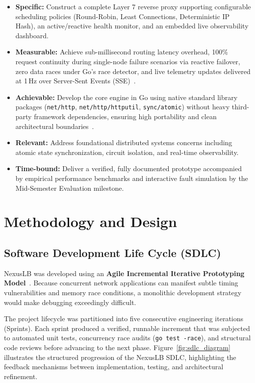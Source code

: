 \documentclass[12pt,openany]{report}
\begin{document}
\begin{itemize}
  \item \textbf{Specific:} Construct a complete Layer 7 reverse proxy supporting configurable scheduling policies (Round-Robin, Least Connections, Deterministic IP Hash), an active/reactive health monitor, and an embedded live observability dashboard.
  \item \textbf{Measurable:} Achieve sub-millisecond routing latency overhead, 100\% request continuity during single-node failure scenarios via reactive failover, zero data races under Go's race detector, and live telemetry updates delivered at 1\,Hz over Server-Sent Events (SSE)~\cite{whatwg_sse}.
  \item \textbf{Achievable:} Develop the core engine in Go using native standard library packages (\texttt{net/http}, \texttt{net/http/httputil}, \texttt{sync/atomic}) without heavy third-party framework dependencies, ensuring high portability and clean architectural boundaries~\cite{donovan2015}.
  \item \textbf{Relevant:} Address foundational distributed systems concerns including atomic state synchronization, circuit isolation, and real-time observability.
  \item \textbf{Time-bound:} Deliver a verified, fully documented prototype accompanied by empirical performance benchmarks and interactive fault simulation by the Mid-Semester Evaluation milestone.
\end{itemize}


\chapter{Methodology and Design}

\section{Software Development Life Cycle (SDLC)}

NexusLB was developed using an \textbf{Agile Incremental Iterative Prototyping Model}~\cite{sommerville2016}. Because concurrent network applications can manifest subtle timing vulnerabilities and memory race conditions, a monolithic development strategy would make debugging exceedingly difficult.

The project lifecycle was partitioned into five consecutive engineering iterations (Sprints). Each sprint produced a verified, runnable increment that was subjected to automated unit tests, concurrency race audits (\texttt{go test -race}), and structural code reviews before advancing to the next phase. Figure~\ref{fig:sdlc_diagram} illustrates the structured progression of the NexusLB SDLC, highlighting the feedback mechanisms between implementation, testing, and architectural refinement.
\end{document}

